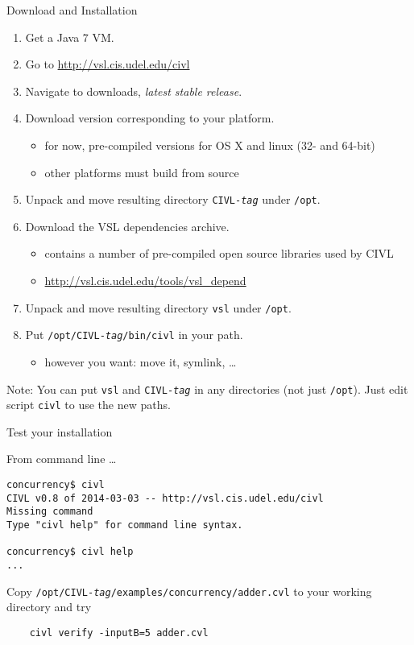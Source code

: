 \documentclass[t]{beamer}
\begin{document}
\begin{frame}{Download and Installation}
  \begin{enumerate}
  \item Get a Java 7 VM.
  \item Go to \url{http://vsl.cis.udel.edu/civl}
  \item Navigate to downloads, \emph{latest stable release}.
  \item Download version corresponding to your platform.
    \begin{itemize}
    \item for now, pre-compiled versions for OS X and linux (32- and 64-bit)
    \item other platforms must build from source
    \end{itemize}
  \item Unpack and move resulting directory \texttt{CIVL-\textit{tag}}
    under \texttt{/opt}.
  \item Download the VSL dependencies archive.
    \begin{itemize}
    \item contains a number of pre-compiled open source libraries used by CIVL
    \item \url{http://vsl.cis.udel.edu/tools/vsl\_depend}
    \end{itemize}
  \item Unpack and move resulting directory \texttt{vsl} under \texttt{/opt}.
  \item Put \texttt{/opt/CIVL-\textit{tag}/bin/civl} in your path.
    \begin{itemize}
    \item however you want: move it, symlink, \ldots
    \end{itemize}
  \end{enumerate}

  \alert{Note:} You can put \texttt{vsl} and \texttt{CIVL-\textit{tag}}
  in any directories (not just \texttt{/opt}).  Just edit script \texttt{civl}
  to use the new paths.
\end{frame}

\begin{frame}[containsverbatim]{Test your installation}

  From command line \ldots

\begin{verbatim}
concurrency$ civl
CIVL v0.8 of 2014-03-03 -- http://vsl.cis.udel.edu/civl
Missing command
Type "civl help" for command line syntax.

concurrency$ civl help
...
\end{verbatim}

Copy \texttt{/opt/CIVL-\textit{tag}/examples/concurrency/adder.cvl}
to your working directory and try

\begin{verbatim}
    civl verify -inputB=5 adder.cvl
\end{verbatim}
\end{frame}
\end{document}
